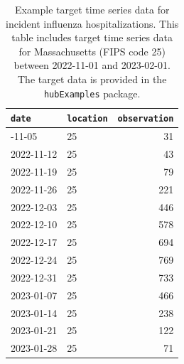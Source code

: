 \documentclass[
]{article}
\begin{document}
\begin{longtable}[]{@{}llr@{}}

\caption{\label{tbl-example-target-time-series-data}Example target time
series data for incident influenza hospitalizations. This table includes
target time series data for Massachusetts (FIPS code 25) between
2022-11-01 and 2023-02-01. The target data is provided in the
\texttt{hubExamples} package.}

\tabularnewline

\toprule\noalign{}
\texttt{date} & \texttt{location} & \texttt{observation} \\
\midrule\noalign{}
\endhead
\bottomrule\noalign{}
\endlastfoot
2022-11-05 & 25 & 31 \\
2022-11-12 & 25 & 43 \\
2022-11-19 & 25 & 79 \\
2022-11-26 & 25 & 221 \\
2022-12-03 & 25 & 446 \\
2022-12-10 & 25 & 578 \\
2022-12-17 & 25 & 694 \\
2022-12-24 & 25 & 769 \\
2022-12-31 & 25 & 733 \\
2023-01-07 & 25 & 466 \\
2023-01-14 & 25 & 238 \\
2023-01-21 & 25 & 122 \\
2023-01-28 & 25 & 71 \\

\end{longtable}

\newpage
\end{document}

